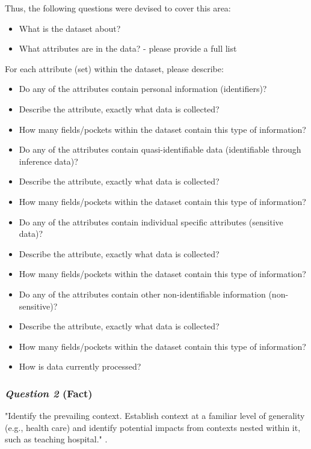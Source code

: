 Thus, the following questions were devised to cover this area:\\
\begin{itemize}

\item What is the dataset about?
\item What attributes are in the data? - please provide a full list\\

\end{itemize}
For each attribute (set) within the dataset, please describe:\\

\begin{itemize}
\item Do any of the attributes contain personal information (identifiers)?
\item Describe the attribute, exactly what data is collected?
\item How many fields/pockets within the dataset contain this type of information?
\item Do any of the attributes contain quasi-identifiable data (identifiable through inference data)?
\item Describe the attribute, exactly what data is collected?
\item How many fields/pockets within the dataset contain this type of information?
\item Do any of the attributes contain individual specific attributes (sensitive data)?
\item Describe the attribute, exactly what data is collected?
\item How many fields/pockets within the dataset contain this type of information?
\item Do any of the attributes contain other non-identifiable information (non-sensitive)?
\item Describe the attribute, exactly what data is collected?
\item How many fields/pockets within the dataset contain this type of information?
\item How is data currently processed?

\end{itemize}

\subsubsection {{\it Question 2} {\bf(Fact)}} 
"Identify the prevailing context. Establish context at a familiar level of generality (e.g., health care) and identify potential impacts from contexts nested within it, such as teaching hospital." \citep{Nissenbaum_2010}.\\

